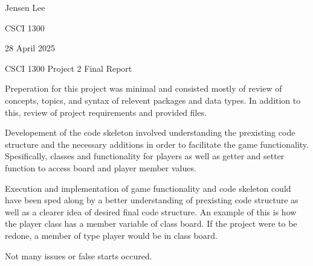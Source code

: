 \documentclass{article}
\begin{document}
Jensen Lee

CSCI 1300

28 April 2025

\begin{center}
    CSCI 1300 Project 2 Final Report
\end{center}

Preperation for this project was minimal and consisted mostly of review of concepts, topics, and syntax of relevent packages and data types. In addition to this, review of project requirements and provided files.

Developement of the code skeleton involved understanding the prexisting code structure and the necessary additions in order to facilitate the game functionality. Spesifically, classes and functionality for players as well as getter and setter function to access board and player member values.

Execution and implementation of game functionality and code skeleton could have been sped along by a better understanding of prexisting code structure as well as a clearer idea of desired final code structure. An example of this is how the player class has a member variable of class board. If the project were to be redone, a member of type player would be in class board.

Not many issues or false starts occured. 
\end{document}
